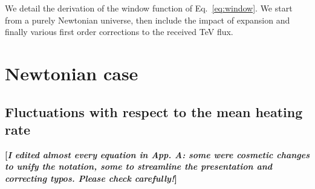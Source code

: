 \documentclass[twocolumns]{emulateapj}
\newcommand\Cc[1]{{\color{blue} \bf #1}} %
\begin{document}
\appendix

We detail the derivation of the window function of Eq.~\eqref{eq:window}. We start from a purely Newtonian universe, then include the impact of expansion and finally various first order corrections to the received TeV flux.\\

\section {Newtonian case}\label{sec:windon_newt}
\subsection {Fluctuations with respect to the mean heating rate}

\Cc{[{\em I edited almost every equation in App. A: some were cosmetic changes to unify the notation, some to streamline the presentation and correcting typos. Please check carefully!}]}
\end{document}
